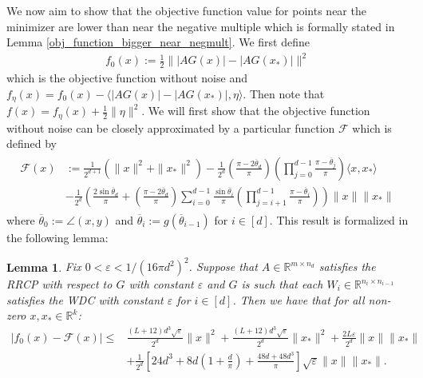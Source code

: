 \documentclass[11pt]{article}
\renewcommand{\epsilon}{\varepsilon}
\newcommand{\R}{\mathbb{R}}
\newcommand{\G}{G}
\newcommand{\F}{\mathcal{F}}
\newtheorem{lem}{Lemma}
\theoremstyle{remark}
\begin{document}
We now aim to show that the objective function value for points near the minimizer are lower than near the negative multiple which is formally stated in Lemma \ref{obj_function_bigger_near_negmult}. We first define \begin{align}
    f_0(x) := \frac{1}{2} \Big\| |A\G(x)| - |A\G(x_*)| \Big\|^2 \nonumber
\end{align} which is the objective function without noise and $f_{\eta}(x) = f_0(x) - \langle |A\G(x)| - |A\G(x_*)|, \eta\rangle.$ Then note that $f(x) = f_{\eta}(x) + \frac{1}{2}\|\eta\|^2$. We will first show that the objective function without noise can be closely approximated by a particular function $\mathcal{F}$ which is defined by \begin{align}\begin{split}
    \F(x) & := \frac{1}{2^{d+1}}(\|x\|^2 + \|x_*\|^2) - \frac{1}{2^d}\left(\frac{\pi - 2 \overline{\theta}_d}{\pi}\right)\left(\prod_{j=0}^{d-1}\frac{\pi - \overline{\theta}_{j}}{\pi}\right)\langle x,x_* \rangle \label{expected_loss_full} \\
    & - \frac{1}{2^d}\left(\frac{2\sin \overline{\theta}_d}{\pi} + \left(\frac{\pi - 2\overline{\theta}_d}{\pi}\right) \sum_{i=0}^{d-1} \frac{\sin \overline{\theta}_i}{\pi}\left(\prod_{j=i+1}^{d-1} \frac{\pi - \overline{\theta}_i}{\pi}\right)\right)\|x\|\|x_*\| %
\end{split}\end{align} where $\overline{\theta}_0 := \angle(x,y)$ and $\overline{\theta}_i := g(\overline{\theta}_{i-1})$ for $i \in [d]$. This result is formalized in the following lemma: \begin{lem} \label{obj_close_to_expectation}
Fix $0 < \epsilon < 1/(16\pi d^2)^2$. Suppose that $A \in \R^{m \times n_d}$ satisfies the RRCP with respect to $\G$ with constant $\epsilon$ and $\G$ is such that each $W_i \in \R^{n_i \times n_{i-1}}$ satisfies the WDC with constant $\epsilon$ for $i \in [d]$. Then we have that for all non-zero $x,x_* \in \R^k$: \begin{align*}
    |f_0(x) - \mathcal{F}(x)| \leqslant & \frac{(L + 12)d^3\sqrt{\epsilon}}{2^d}\|x\|^2 + \frac{(L+12)d^3\sqrt{\epsilon}}{2^d}\|x_*\|^2 + \frac{2L\epsilon}{2^d}\|x\|\|x_*\|  \\
    & + \frac{1}{2^d}\left[24d^3 + 8d\left(1 + \frac{d}{\pi}\right) + \frac{48d + 48d^3}{\pi}\right]\sqrt{\epsilon}\|x\|\|x_*\|.
\end{align*}
\end{lem}
\end{document}
